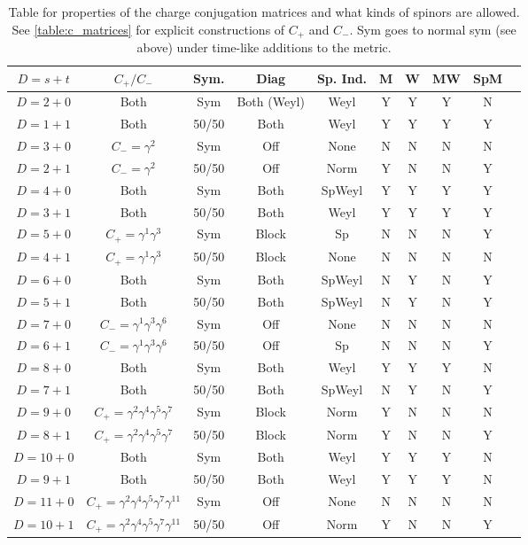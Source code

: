 \documentclass[11pt]{article}
\begin{document}
\begin{table}[H]
    \centering
    \begin{tabular}{|c|c|c|c|c|c|c|c|c|c|}
        \hline
        $D = s + t$ & $C_+/C_-$ & Sym. & Diag & Sp. Ind. & M & W & MW & SpM\\
        \hline
        $D = 2 + 0$ & Both & Sym & Both (Weyl) & Weyl & Y & Y & Y & N\\
        $D = 1 + 1$ & Both & 50/50 & Both & Weyl & Y & Y & Y & Y\\
        $D = 3 + 0$ & $C_- = \gamma^2$ & Sym & Off & None & N & N & N & N\\
        $D = 2 + 1$ & $C_- = \gamma^2$ & 50/50 & Off & Norm & Y & N & N & Y\\
        $D = 4 + 0$ & Both & Sym & Both & SpWeyl & Y & Y & Y & Y\\
        $D = 3 + 1$ & Both & 50/50 & Both & Weyl & Y & Y & Y & Y\\
        $D = 5 + 0$ & $C_+ = \gamma^1 \gamma^3$ & Sym & Block & Sp & N & N & N & Y\\
        $D = 4 + 1$ & $C_+ = \gamma^1 \gamma^3$ & 50/50 & Block & None & N & N & N & N\\
        $D = 6 + 0$ & Both & Sym & Both & SpWeyl & N & Y & N & Y\\
        $D = 5 + 1$ & Both & 50/50 & Both & SpWeyl & N & Y & N & Y\\
        $D = 7 + 0$ & $C_- = \gamma^1 \gamma^3 \gamma^6$ & Sym & Off & None & N & N & N & N\\
        $D = 6 + 1$ & $C_- = \gamma^1 \gamma^3 \gamma^6$ & 50/50 & Off & Sp & N & N & N & Y\\
        $D = 8 + 0$ & Both & Sym & Both & Weyl & Y & Y & Y & N\\
        $D = 7 + 1$ & Both & 50/50 & Both & SpWeyl & N & Y & N & Y\\
        $D = 9 + 0$ & $C_+ = \gamma^2 \gamma^4 \gamma^5 \gamma^7$ & Sym & Block & Norm & Y & N & N & N\\
        $D = 8 + 1$ & $C_+ = \gamma^2 \gamma^4 \gamma^5 \gamma^7$ & 50/50 & Block & Norm & Y & N & N & Y\\
        $D = 10 + 0$ & Both & Sym & Both & Weyl & Y & Y & Y & N\\
        $D = 9 + 1$ & Both & 50/50 & Both & Weyl & Y & Y & Y & N\\
        $D = 11 + 0$ & $C_+ = \gamma^2 \gamma^4 \gamma^5 \gamma^7 \gamma^{11}$ & Sym & Off & None & N & N & N & N\\
        $D = 10 + 1$ & $C_+ = \gamma^2 \gamma^4 \gamma^5 \gamma^7 \gamma^{11}$ & 50/50 & Off & Norm & Y & N & N & Y\\
        \hline
    \end{tabular}
    \caption{Table for properties of the charge conjugation matrices
    and what kinds of spinors are allowed. See \ref{table:c_matrices}
    for explicit constructions of $C_+$ and $C_-$. Sym goes to
    normal sym (see above) under time-like additions to the metric.}
\end{table}
\end{document}
